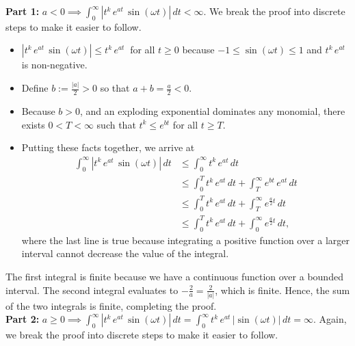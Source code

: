 \textbf{Part 1:} $a<0 \implies \int_0^\infty |t^k\,e^{at}\, \sin(\omega t) | \, dt < \infty.$ We break the proof into discrete steps to make it easier to follow.\\

\begin{itemize}
    \item $|t^k\,e^{at}\, \sin(\omega t)| \le t^k\,e^{at}\ $ for all $t\ge 0$ because $-1 \le \sin(\omega t) \le 1$ and $t^k\,e^{at}$ is non-negative. 
    \item Define $b:=\frac{|a|}{2}>0$ so that $a + b = \frac{a}{2} < 0$.
    \item Because $b>0$, and an exploding exponential dominates any monomial, there exists $0< T < \infty$ such that $t^k \le e^{bt}$ for all $t\ge T$.
    \item Putting these facts together, we arrive at  
    \begin{equation}
        \begin{aligned}
             \int_0^\infty |t^k\,e^{at}\, \sin(\omega t) | \, dt & \le  \int_0^\infty t^k\,e^{at} \, dt\\
             &\le  \int_0^T t^k\,e^{at} \, dt +  \int_T^\infty e^{bt}\,e^{at} \, dt \\
              &\le  \int_0^T t^k\,e^{at} \, dt +  \int_T^\infty e^{\frac{a}{2}t}  \, dt \\
             &\le \int_0^T t^k\,e^{at} \, dt +  \int_0^\infty e^{\frac{a}{2}t} \, dt,
        \end{aligned}
    \end{equation}
where the last line is true because integrating a positive function over a larger interval cannot decrease the value of the integral. 
\end{itemize}
The first integral is finite because we have a continuous function over a bounded interval. The second integral evaluates to $-\frac{2}{a}=\frac{2}{|a|}$, which is finite. Hence, the sum of the two integrals is finite, completing the proof.\\
 
\textbf{Part 2:} $a\ge 0 \implies \int_0^\infty |t^k\,e^{at}\, \sin(\omega t) | \, dt = \int_0^\infty t^k\,e^{at}\, |\sin(\omega t) | \, dt = \infty$. Again, we break the proof into discrete steps to make it easier to follow.\\

